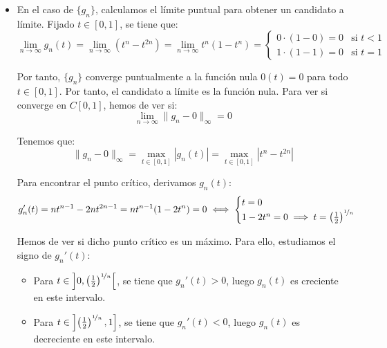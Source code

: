 \begin{ejercicio}
\begin{enumerate}
\begin{itemize}
        \item En el caso de $\{g_n\}$, calculamos el límite puntual para obtener un candidato a límite. Fijado $t \in \left[0, 1\right]$, se tiene que:
        \begin{equation*}
            \lim_{n \to \infty} g_n(t) = \lim_{n \to \infty} (t^n - t^{2n}) = \lim_{n \to \infty} t^n (1 - t^n) = \begin{cases}
                0 \cdot (1 - 0) = 0 & \text{si } t<1\\
                1 \cdot (1 - 1) = 0 & \text{si } t=1
            \end{cases}
        \end{equation*}

        Por tanto, $\{g_n\}$ converge puntualmente a la función nula $0(t) = 0$ para todo $t \in \left[0, 1\right]$. Por tanto, el candidato a límite es la función nula. Para ver si converge en $C\left[0, 1\right]$, hemos de ver si:
        \begin{equation*}
            \lim_{n \to \infty} \|g_n - 0\|_\infty = 0
        \end{equation*}
        
        Tenemos que:
        \begin{equation*}
            \|g_n-0\|_\infty = \max_{t \in \left[0, 1\right]} |g_n(t)| = \max_{t \in \left[0, 1\right]} |t^n - t^{2n}|
        \end{equation*}

        Para encontrar el punto crítico, derivamos $g_n(t)$:
        \begin{equation*}
            g_n'(t) = n t^{n-1} - 2n t^{2n-1} = n t^{n-1} (1 - 2 t^n) = 0\iff \begin{cases}
                t = 0\\
                1 - 2 t^n = 0 \implies t = \left(\frac{1}{2}\right)^{\nicefrac{1}{n}}
            \end{cases}
        \end{equation*}

        Hemos de ver si dicho punto crítico es un máximo. Para ello, estudiamos el signo de $g_n'(t)$:
        \begin{itemize}
            \item Para $t \in \left]0, \left(\frac{1}{2}\right)^{\nicefrac{1}{n}}\right[$, se tiene que $g_n'(t) > 0$, luego $g_n(t)$ es creciente en este intervalo.
            \item Para $t \in \left]\left(\frac{1}{2}\right)^{\nicefrac{1}{n}}, 1\right]$, se tiene que $g_n'(t) < 0$, luego $g_n(t)$ es decreciente en este intervalo.
        \end{itemize}


\end{itemize}
\end{enumerate}
\end{ejercicio}
